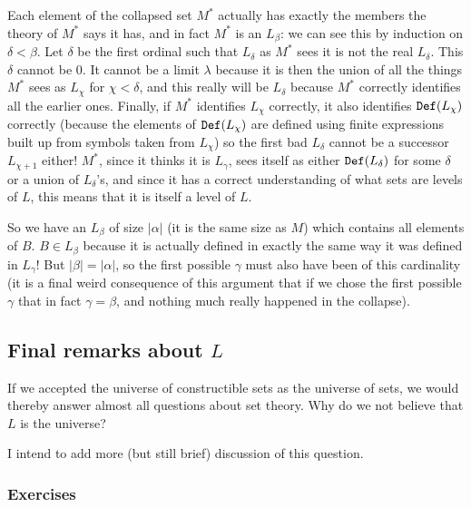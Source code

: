 \documentclass[12pt]{book}
\begin{document}
Each element of the collapsed set $M^*$ actually has exactly the members the theory of $M^*$ says it has, and in fact $M^*$ is an $L_{\beta}$:  we can see this  by induction on
$\delta<\beta$.  Let $\delta$ be the first ordinal such that $L_{\delta}$ as $M^*$ sees it is not the real $L_{\delta}$.  This $\delta$ cannot be 0.  It cannot be a limit $\lambda$ because
it is then the union of all the things $M^*$ sees as $L_{\chi}$ for $\chi<\delta$, and this really will be $L_{\delta}$ because $M^*$ correctly identifies all the earlier ones.
Finally, if $M^*$ identifies $L_{\chi}$ correctly, it also identifies ${\tt Def}(L_{\chi})$ correctly (because the elements of ${\tt Def}(L_{\chi})$ are defined using finite expressions
built up from symbols taken from $L_{\chi}$) so the first bad $L_{\delta}$ cannot be a successor $L_{\chi+1}$ either!  $M^*$, since it thinks it is $L_{\gamma}$, sees itself as either
${\tt Def}(L_{\delta})$ for some $\delta$ or a union of $L_{\delta}$'s, and since it has a correct understanding of what sets are levels of $L$, this means that it is itself a level of $L$.

So we have an $L_{\beta}$ of size $|\alpha|$ (it is the same size as $M$) which contains all elements of $B$.  $B \in L_{\beta}$ because it is actually defined in exactly the same way it was defined in $L_{\gamma}$!  But $|\beta|=|\alpha|$, so the first possible $\gamma$ must also have been of this cardinality (it is a final weird consequence of this argument that if we chose the first possible $\gamma$ that in fact $\gamma=\beta$, and nothing much really happened in the collapse).

\newpage

\subsection{Final remarks about $L$}

If we accepted the universe of constructible sets as the universe of sets, we would thereby answer almost all questions about set theory.   Why do we not believe that $L$ is the universe?

I intend to add more (but still brief) discussion of this question.

\subsubsection{Exercises}
\end{document}

